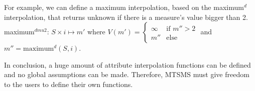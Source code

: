 For example, we can define a maximum interpolation, based on the
maximum$^d$ interpolation, that returns unknown if there is a
measure's value bigger than 2.  maximum$^{dmu2}$: $S \times i
\mapsto m'$ where $V(m') = 
\begin{cases}
  \infty &\text{if }  m''>2\\
  m'' & \text{else }
\end{cases}$ and $m''=\text{maximum}^d(S,i)$.

    
In conclusion, a huge amount of attribute interpolation functions can
be defined and no global assumptions can be made. Therefore, MTSMS
must give freedom to the users to define their own functions.




















